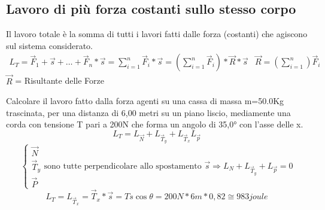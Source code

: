 \subsection{Lavoro di più forza costanti sullo stesso corpo}
Il lavoro totale è la somma di tutti i lavori fatti dalle forza (costanti) che
agiscono sul sistema considerato.
\begin{equation*}
	\begin{matrix}
	L_T=\vec{F}_1+\vec{s} +
	\dots+\vec{F}_n*\vec{s}=\displaystyle\sum_{i=1}^{n}
	\vec{F}_i*\vec{s}=\left(\displaystyle\sum_{i=1}^{n}
	\vec{F}_i\right)*\vec{R}*\vec{s} &
		\vec{R}=\left(\displaystyle\sum_{i=1}^{n}\right) \vec{F}_i
	\end{matrix}
\end{equation*}
$\vec{R}$ = Risultante delle Forze
\begin{esempio}
	Calcolare il lavoro fatto dalla forza agenti su una cassa di massa m=50.0Kg
	trascinata, per una distanza di 6,00 metri su un piano liscio, mediamente
	una corda con tensione T pari a 200N che forma un angolo di 35,0° con
	l'asse delle x.
	\begin{equation*}
		L_T=L_{\vec{N}}+L_{\vec{T}_y} + L_{\vec{T}_x} L_{\vec{p}}
	\end{equation*}
	\begin{equation*}
		\begin{cases}
			\vec{N}\\
			\vec{T}_y\\
			\vec{P}
		\end{cases}
		\text{sono tutte perpendicolare allo spostamento } \vec{s} \Rightarrow
		L_N + L_{\vec{T}_y} + L_{\vec{p}} = 0
	\end{equation*}
	\begin{equation*}
		L_T=L_{\vec{T}_x}=\vec{T}_x*\vec{s}=Ts\cos \theta = 200N*6m*0,82 \cong
		\boxed{983 joule}
	\end{equation*}
\end{esempio}
